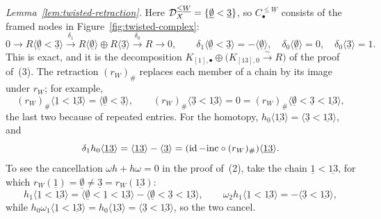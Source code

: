 \documentclass[a4paper,leqno]{amsart}
\begin{document}
{\begin{eg}
\smallskip
\noindent\textit{Lemma~\ref{lem:twisted-retraction}.}
Here $\mathcal D_X^{\leq\underline{W}}=\{\underline{\emptyset}<\underline{3}\}$, so $C^{\leq\underline{W}}_\bullet$ consists of the framed nodes in Figure~\ref{fig:twisted-complex}:
\[
 0\longrightarrow R\langle\underline{\emptyset}<\underline{3}\rangle
 \xrightarrow{\ \delta_1\ }R\langle\underline{\emptyset}\rangle\oplus R\langle\underline{3}\rangle
 \xrightarrow{\ \delta_0\ }R\longrightarrow0,
 \qquad
 \delta_1\langle\underline{\emptyset}<\underline{3}\rangle=-\langle\underline{\emptyset}\rangle,\quad
 \delta_0\langle\underline{\emptyset}\rangle=0,\quad
 \delta_0\langle\underline{3}\rangle=1.
\]
This is exact, and it is the decomposition $K_{[1],\bullet}\oplus\bigl(K_{[13],0}\xrightarrow{\sim}R\bigr)$ of the proof of~(3). The retraction $(r_W)_\#$ replaces each member of a chain by its image under $r_W$; for example,
\[
 (r_W)_\#\langle\underline{1}<\underline{13}\rangle=\langle\underline{\emptyset}<\underline{3}\rangle,
 \qquad
 (r_W)_\#\langle\underline{3}<\underline{13}\rangle=0=(r_W)_\#\langle\underline{\emptyset}<\underline{3}<\underline{13}\rangle,
\]
the last two because of repeated entries. For the homotopy, $h_0\langle\underline{13}\rangle=\langle\underline{3}<\underline{13}\rangle$, and
\[
 \delta_1h_0\langle\underline{13}\rangle=\langle\underline{13}\rangle-\langle\underline{3}\rangle=(\operatorname{id}-\mathrm{inc}\circ(r_W)_\#)\langle\underline{13}\rangle.
\]
To see the cancellation $\omega h+h\omega=0$ in the proof of~(2), take the chain $\underline{1}<\underline{13}$, for which $r_W(\underline{1})=\underline{\emptyset}\neq\underline{3}=r_W(\underline{13})$:
\[
 h_1\langle\underline{1}<\underline{13}\rangle=\langle\underline{\emptyset}<\underline{1}<\underline{13}\rangle-\langle\underline{\emptyset}<\underline{3}<\underline{13}\rangle,
 \qquad
 \omega_2h_1\langle\underline{1}<\underline{13}\rangle=-\langle\underline{3}<\underline{13}\rangle,
\]
while $h_0\omega_1\langle\underline{1}<\underline{13}\rangle=h_0\langle\underline{13}\rangle=\langle\underline{3}<\underline{13}\rangle$, so the two cancel.
\end{eg}}
\end{document}
